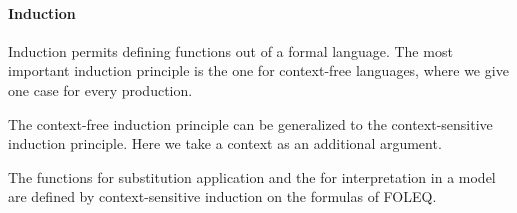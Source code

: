 \paragraph{Induction}
Induction permits defining functions out of a formal language.
The most important induction principle is the one for context-free languages, where we give one case for every production.

The context-free induction principle can be generalized to the context-sensitive induction principle.
Here we take a context as an additional argument.
\medskip

The functions for substitution application and the for interpretation in a model are defined by context-sensitive induction on the formulas of FOLEQ.